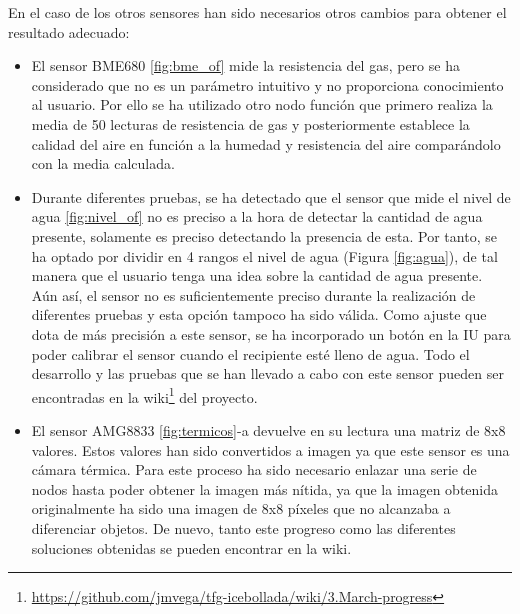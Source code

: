 En el caso de los otros sensores han sido necesarios otros cambios para obtener el resultado adecuado:
\begin{itemize}
	\item El sensor BME680 \ref{fig:bme_of} mide la resistencia del gas, pero se ha considerado que no es un parámetro intuitivo y no proporciona conocimiento al usuario. Por ello se ha utilizado otro nodo función que primero realiza la media de 50 lecturas de resistencia de gas y posteriormente establece la calidad del aire en función a la humedad y resistencia del aire comparándolo con la media calculada.
	
	\item Durante diferentes pruebas, se ha detectado que el sensor que mide el nivel de agua \ref{fig:nivel_of} no es preciso a la hora de detectar la cantidad de agua presente, solamente es preciso detectando la presencia de esta. Por tanto, se ha optado por dividir en 4 rangos el nivel de agua (Figura \ref{fig:agua}), de tal manera que el usuario tenga una idea sobre la cantidad de agua presente. Aún así, el sensor no es suficientemente preciso durante la realización de diferentes pruebas y esta opción tampoco ha sido válida. Como ajuste que dota de más precisión a este sensor, se ha incorporado un botón en la IU para poder calibrar el sensor cuando el recipiente esté lleno de agua. Todo el desarrollo y las pruebas que se han llevado a cabo con este sensor pueden ser encontradas en la wiki\footnote{\url{https://github.com/jmvega/tfg-icebollada/wiki/3.March-progress}} del proyecto.
	
	\item El sensor AMG8833 \ref{fig:termicos}-a devuelve en su lectura una matriz de 8x8 valores. Estos valores han sido convertidos a imagen ya que este sensor es una cámara térmica. Para este proceso ha sido necesario enlazar una serie de nodos hasta poder obtener la imagen más nítida, ya que la imagen obtenida originalmente ha sido una imagen de 8x8 píxeles que no alcanzaba a diferenciar objetos. De nuevo, tanto este progreso como las diferentes soluciones obtenidas se pueden encontrar en la wiki. 
\end{itemize}
